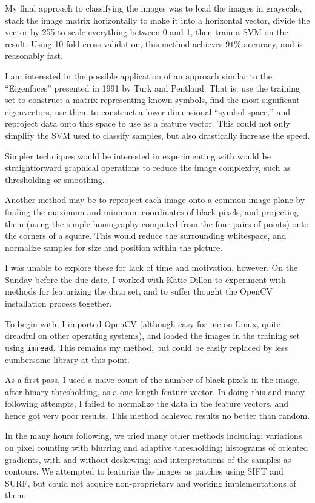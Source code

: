 \documentclass[12pt]{article}
\begin{document}
My final approach to classifying the images was to load the images in grayscale,
stack the image matrix horizontally to make it into a horizontal vector, divide
the vector by 255 to scale everything between 0 and 1, then train a SVM on the
result. Using 10-fold cross-validation, this method achieves $91\%$ accuracy,
and is reasonably fast.

I am interested in the possible application of an approach similar to the
``Eigenfaces'' presented in 1991 by Turk and Pentland. That is: use the training
set to construct a matrix representing known symbols, find the most significant
eigenvectors, use them to construct a lower-dimensional ``symbol space,'' and
reproject data onto this space to use as a feature vector. This could not only
simplify the SVM used to classify samples, but also drastically increase the
speed.

Simpler techniques would be interested in experimenting with would be
straightforward graphical operations to reduce the image complexity, such as
thresholding or smoothing.

Another method may be to reproject each image onto a common image plane by
finding the maximum and minimum coordinates of black pixels, and projecting them
(using the simple homography computed from the four pairs of points) onto the
corners of a square. This would reduce the surrounding whitespace, and normalize
samples for size and position within the picture.

I was unable to explore these for lack of time and motivation, however. On the
Sunday before the due date, I worked with Katie Dillon to experiment with
methods for featurizing the data set, and to suffer thought the OpenCV
installation process together.

To begin with, I imported OpenCV (although easy for me on Linux, quite dreadful
on other operating systems), and loaded the images in the training set
using \verb+imread+. This remains my method, but could be easily replaced by
less cumbersome library at this point.

As a first pass, I used a naive count of the number of black pixels in the
image, after binary thresholding, as a one-length feature vector. In doing this
and many following attempts, I failed to normalize the data in the feature
vectors, and hence got very poor results. This method achieved results no better
than random.

In the many hours following, we tried many other methods including: variations
on pixel counting with blurring and adaptive thresholding; histograms of
oriented gradients, with and without deskewing; and interpretations of the
samples as contours. We attempted to featurize the images as patches using SIFT
and SURF, but could not acquire non-proprietary and working implementations of
them.
\end{document}
